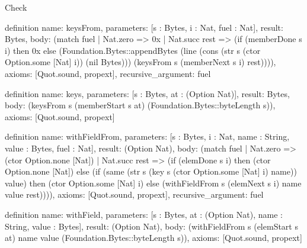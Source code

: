 \begin{lexlean}{Check}
\begin{semanticmodule}
definition{
  name: keysFrom,
  parameters: [s : Bytes, i : Nat, fuel : Nat],
  result: Bytes,
  body: (match fuel
    | Nat.zero => 0x
    | Nat.succ rest => (if (memberDone s i) then 0x else (Foundation.Bytes::appendBytes (line (cons (str s (ctor Option.some [Nat] i)) (nil Bytes))) (keysFrom s (memberNext s i) rest)))),
  axioms: [Quot.sound, propext],
  recursive_argument: fuel
}

definition{
  name: keys,
  parameters: [s : Bytes, at : (Option Nat)],
  result: Bytes,
  body: (keysFrom s (memberStart s at) (Foundation.Bytes::byteLength s)),
  axioms: [Quot.sound, propext]
}

definition{
  name: withFieldFrom,
  parameters: [s : Bytes, i : Nat, name : String, value : Bytes, fuel : Nat],
  result: (Option Nat),
  body: (match fuel
    | Nat.zero => (ctor Option.none [Nat])
    | Nat.succ rest => (if (elemDone s i) then (ctor Option.none [Nat]) else (if (same (str s (key s (ctor Option.some [Nat] i) name)) value) then (ctor Option.some [Nat] i) else (withFieldFrom s (elemNext s i) name value rest)))),
  axioms: [Quot.sound, propext],
  recursive_argument: fuel
}

definition{
  name: withField,
  parameters: [s : Bytes, at : (Option Nat), name : String, value : Bytes],
  result: (Option Nat),
  body: (withFieldFrom s (elemStart s at) name value (Foundation.Bytes::byteLength s)),
  axioms: [Quot.sound, propext]
}
\end{semanticmodule}
\end{lexlean}

